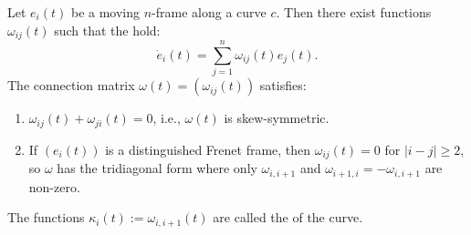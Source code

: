 Let $e_i(t)$ be a moving $n$-frame along a curve $c$. Then there exist functions $\omega_{ij}(t)$ such that the  hold:
$$\dot{e}_i(t) = \sum_{j=1}^n \omega_{ij}(t) e_j(t).$$
The connection matrix $\omega(t) = (\omega_{ij}(t))$ satisfies:
\begin{enumerate}
\item[(i)] $\omega_{ij}(t) + \omega_{ji}(t) = 0$, i.e., $\omega(t)$ is skew-symmetric.
\item[(ii)] If $(e_i(t))$ is a distinguished Frenet frame, then $\omega_{ij}(t) = 0$ for $|i-j| \geq 2$, so $\omega$ has the tridiagonal form where only $\omega_{i,i+1}$ and $\omega_{i+1,i} = -\omega_{i,i+1}$ are non-zero.
\end{enumerate}
The functions $\kappa_i(t) := \omega_{i,i+1}(t)$ are called the  of the curve.
